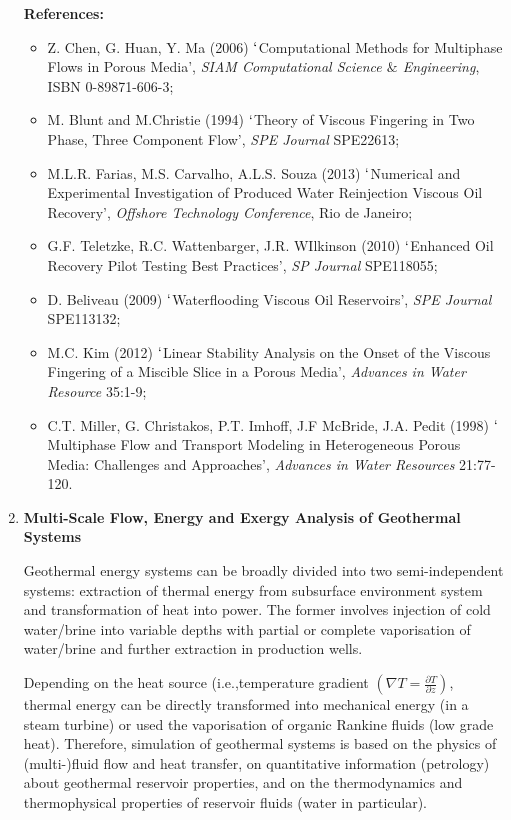 \documentclass[12pts,a4paper,amsmath,amssymb,floatfix]{article}%
\begin{document}
\begin{enumerate}[label=\bfseries Project \arabic*:]
\noindent
{\bf References:}
\begin{itemize}
\item Z. Chen, G. Huan, Y. Ma (2006) $\lq$Computational Methods for Multiphase Flows in Porous Media', {\it SIAM Computational Science $\&$ Engineering}, ISBN 0-89871-606-3;
\item M. Blunt and M.Christie (1994) $\lq$Theory of Viscous Fingering in Two Phase, Three Component Flow', {\it SPE Journal} SPE22613;
\item M.L.R. Farias, M.S. Carvalho, A.L.S. Souza (2013) $\lq$Numerical and Experimental Investigation of Produced Water Reinjection Viscous Oil Recovery', {\it Offshore Technology Conference}, Rio de Janeiro;
\item G.F. Teletzke, R.C. Wattenbarger, J.R. WIlkinson (2010) $\lq$Enhanced Oil Recovery Pilot Testing Best Practices', {\it SP Journal} SPE118055;
\item D. Beliveau (2009) $\lq$Waterflooding Viscous Oil Reservoirs', {\it SPE Journal} SPE113132;
\item M.C. Kim (2012) $\lq$Linear Stability Analysis on the Onset of the Viscous Fingering of a Miscible Slice in a Porous Media', {\it Advances in Water Resource} 35:1-9;%
\item C.T. Miller, G. Christakos, P.T. Imhoff, J.F McBride, J.A. Pedit (1998) $\lq$Multiphase Flow and Transport Modeling in Heterogeneous Porous Media: Challenges and Approaches', {\it Advances in Water Resources} 21:77-120.
\end{itemize}

\clearpage
\item {\bf Multi-Scale Flow, Energy and Exergy Analysis of Geothermal Systems}

Geothermal energy systems can be broadly divided into two semi-independent systems: extraction of thermal energy from subsurface environment system and transformation of heat into power. The former involves injection of cold water/brine into variable depths with partial or complete vaporisation of water/brine and further extraction in production wells. 

Depending on the heat source (i.e.,temperature gradient $\left(\nabla T=\frac{\partial T}{\partial z}\right)$, thermal energy can be directly transformed into mechanical energy (in a steam turbine) or used the vaporisation of organic Rankine fluids (low grade heat). Therefore, simulation of geothermal systems is based on the physics of (multi-)fluid flow and heat transfer, on quantitative information (petrology) about geothermal reservoir properties, and on the thermodynamics and thermophysical properties of reservoir fluids (water in particular). 



\end{enumerate}
\end{document}
